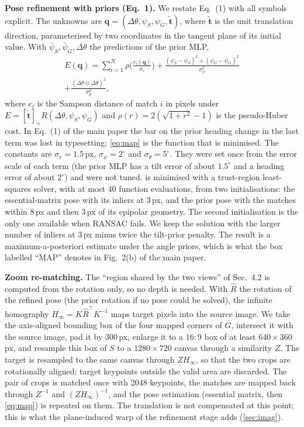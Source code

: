 \documentclass[10pt,twocolumn,letterpaper]{article}
\newcommand{\dth}{\Delta\theta}
\newcommand{\wrapd}{\ominus}
\begin{document}
\noindent\textbf{Pose refinement with priors (Eq.~1).} We restate Eq.~(1) with all symbols explicit. The unknowns are $\mathbf{q}=(\dth,\psi_S,\psi_G,\tilde{\mathbf{t}})$, where $\tilde{\mathbf{t}}$ is the unit translation direction, parameterised by two coordinates in the tangent plane of its initial value. With $\bar\psi_S,\bar\psi_G,\overline{\dth}$ the predictions of the prior MLP,
\begin{multline}
E(\mathbf{q})=\sum_{i=1}^{N}\rho\!\Big(\frac{e_i(\mathbf{q})}{\sigma_e}\Big)+\frac{(\psi_S-\bar\psi_S)^2+(\psi_G-\bar\psi_G)^2}{\sigma_\psi^2}\\
+\frac{(\dth\wrapd\overline{\dth})^2}{\sigma_\theta^2},
\label{eq:map}
\end{multline}
where $e_i$ is the Sampson distance of match $i$ in pixels under $E=[\tilde{\mathbf{t}}]_\times R(\dth,\psi_S,\psi_G)$ and $\rho(r)=2(\sqrt{1+r^2}-1)$ is the pseudo-Huber cost. In Eq.~(1) of the main paper the bar on the prior heading change in the last term was lost in typesetting; \cref{eq:map} is the function that is minimised. The constants are $\sigma_e{=}1.5$\,px, $\sigma_\psi{=}2^\circ$ and $\sigma_\theta{=}5^\circ$. They were set once from the error scale of each term (the prior MLP has a tilt error of about $1.5^\circ$ and a heading error of about $2^\circ$) and were not tuned.  is minimised with a trust-region least-squares solver, with at most 40 function evaluations, from two initialisations: the essential-matrix pose with its inliers at 3\,px, and the prior pose with the matches within 8\,px and then 3\,px of its epipolar geometry. The second initialisation is the only one available when RANSAC fails. We keep the solution with the larger number of inliers at 3\,px minus twice the tilt-prior penalty. The result is a maximum-a-posteriori estimate under the angle priors, which is what the box labelled ``MAP'' denotes in Fig.~2(b) of the main paper.

\noindent\textbf{Zoom re-matching.} The ``region shared by the two views'' of Sec.~4.2 is computed from the rotation only, so no depth is needed. With $\hat R$ the rotation of the refined pose (the prior rotation if no pose could be solved), the infinite homography $H_\infty=K\hat R^{\!\top}K^{-1}$ maps target pixels into the source image. We take the axis-aligned bounding box of the four mapped corners of $G$, intersect it with the source image, pad it by 300\,px, enlarge it to a $16{:}9$ box of at least $640{\times}360$\,px, and resample this box of $S$ to a $1280{\times}720$ canvas through a similarity $Z$. The target is resampled to the same canvas through $ZH_\infty$, so that the two crops are rotationally aligned; target keypoints outside the valid area are discarded. The pair of crops is matched once with 2048 keypoints, the matches are mapped back through $Z^{-1}$ and $(ZH_\infty)^{-1}$, and the pose estimation (essential matrix, then \cref{eq:map}) is repeated on them. The translation is not compensated at this point; this is what the plane-induced warp of the refinement stage adds (\cref{sec:imag}).
\end{document}
